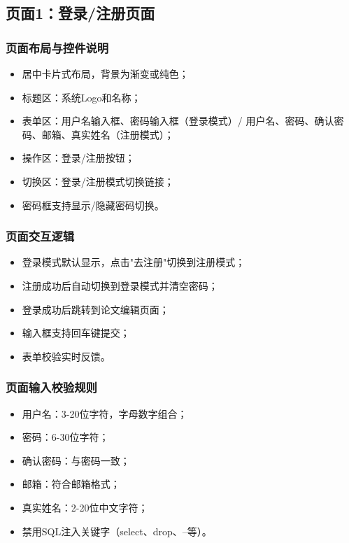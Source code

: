 \documentclass{../template/softeng}
\begin{document}
	\subsection{页面1：登录/注册页面}

	\subsubsection{页面布局与控件说明}
	\begin{itemize}
		\item 居中卡片式布局，背景为渐变或纯色；
		\item 标题区：系统Logo和名称；
		\item 表单区：用户名输入框、密码输入框（登录模式）/ 用户名、密码、确认密码、邮箱、真实姓名（注册模式）；
		\item 操作区：登录/注册按钮；
		\item 切换区：登录/注册模式切换链接；
		\item 密码框支持显示/隐藏密码切换。
	\end{itemize}

	\subsubsection{页面交互逻辑}
	\begin{itemize}
		\item 登录模式默认显示，点击"去注册"切换到注册模式；
		\item 注册成功后自动切换到登录模式并清空密码；
		\item 登录成功后跳转到论文编辑页面；
		\item 输入框支持回车键提交；
		\item 表单校验实时反馈。
	\end{itemize}

	\subsubsection{页面输入校验规则}
	\begin{itemize}
		\item 用户名：3-20位字符，字母数字组合；
		\item 密码：6-30位字符；
		\item 确认密码：与密码一致；
		\item 邮箱：符合邮箱格式；
		\item 真实姓名：2-20位中文字符；
		\item 禁用SQL注入关键字（select、drop、--等）。
	\end{itemize}
\end{document}
